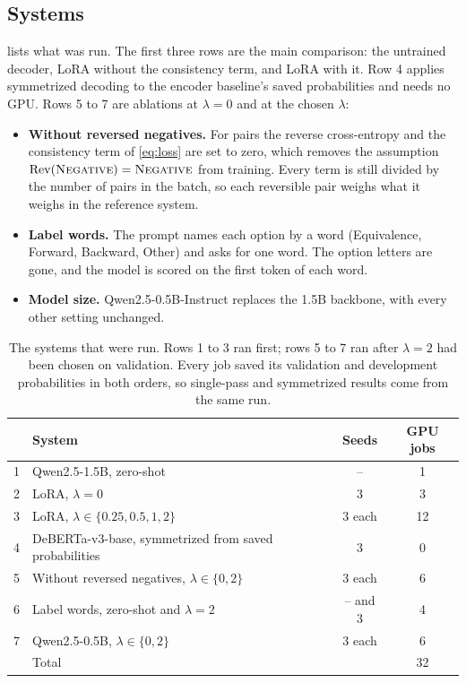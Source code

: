 \subsection{Systems}
\label{sec:setup-systems}

 lists what was run. The first three rows are the main comparison: the untrained decoder, LoRA without the consistency term, and LoRA with it. Row 4 applies symmetrized decoding to the encoder baseline's saved probabilities and needs no GPU. Rows 5 to 7 are ablations at $\lambda = 0$ and at the chosen $\lambda$:

\begin{itemize}
\setlength{\itemsep}{1pt}
\setlength{\parskip}{0pt}
\item \textbf{Without reversed negatives.} For \NO{} pairs the reverse cross-entropy and the consistency term of \cref{eq:loss} are set to zero, which removes the assumption $\operatorname{Rev}(\textsc{Negative}) = \textsc{Negative}$ from training. Every term is still divided by the number of pairs in the batch, so each reversible pair weighs what it weighs in the reference system.
\item \textbf{Label words.} The prompt names each option by a word (Equivalence, Forward, Backward, Other) and asks for one word. The option letters are gone, and the model is scored on the first token of each word.
\item \textbf{Model size.} Qwen2.5-0.5B-Instruct replaces the 1.5B backbone, with every other setting unchanged.
\end{itemize}

\begin{table}[t]
\centering
\small
\begin{tabular}{@{}rN{0.50\columnwidth}cc@{}}
\toprule
 & System & Seeds & GPU jobs \\
 & Qwen2.5-1.5B, zero-shot & -- & 1 \\
2 & LoRA, $\lambda = 0$ & 3 & 3 \\
3 & LoRA, $\lambda \in \{0.25, 0.5, 1, 2\}$ & 3 each & 12 \\
4 & DeBERTa-v3-base, symmetrized from saved probabilities & 3 & 0 \\
5 & Without reversed negatives, $\lambda \in \{0, 2\}$ & 3 each & 6 \\
6 & Label words, zero-shot and $\lambda = 2$ & -- and 3 & 4 \\
7 & Qwen2.5-0.5B, $\lambda \in \{0, 2\}$ & 3 each & 6 \\
\midrule
 & Total & & 32 \\
\bottomrule
\end{tabular}
\caption{The systems that were run. Rows 1 to 3 ran first; rows 5 to 7 ran after $\lambda = 2$ had been chosen on validation. Every job saved its validation and development probabilities in both orders, so single-pass and symmetrized results come from the same run.}
\label{tab:systems}
\end{table}

